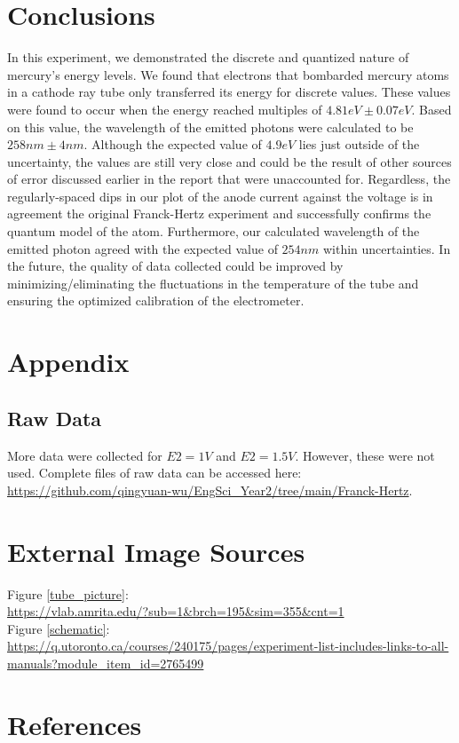\documentclass[12pt,twocolumn,letterpaper]{article}
\begin{document}


\section{Conclusions}
In this experiment, we demonstrated the discrete and quantized nature of mercury's energy levels. We found that electrons that bombarded mercury atoms in a cathode ray tube only transferred its energy for discrete values. These values were found to occur when the energy reached multiples of $4.81 eV \pm 0.07 eV$. Based on this value, the wavelength of the emitted photons were calculated to be $258 nm \pm 4 nm$. Although the expected value of $4.9 eV$ lies just outside of the uncertainty, the values are still very close and could be the result of other sources of error discussed earlier in the report that were unaccounted for. Regardless, the regularly-spaced dips in our plot of the anode current against the voltage is in agreement the original Franck-Hertz experiment and successfully confirms the quantum model of the atom. Furthermore, our calculated wavelength of the emitted photon agreed with the expected value of $254 nm$ within uncertainties. In the future, the quality of data collected could be improved by minimizing/eliminating the fluctuations in the temperature of the tube and ensuring the optimized calibration of the electrometer.

\section{Appendix}
\subsection{Raw Data}
More data were collected for $E2=1V$ and $E2 = 1.5V$. However, these were not used. Complete files of raw data can be accessed here: \url{https://github.com/qingyuan-wu/EngSci_Year2/tree/main/Franck-Hertz}.

\newpage
\section*{External Image Sources}
Figure \ref{tube_picture}: \\
\url{https://vlab.amrita.edu/?sub=1&brch=195&sim=355&cnt=1}
\\
Figure \ref{schematic}: \\
\url{https://q.utoronto.ca/courses/240175/pages/experiment-list-includes-links-to-all-manuals?module_item_id=2765499}
\\

\section{References}
\printbibliography
\end{document}
